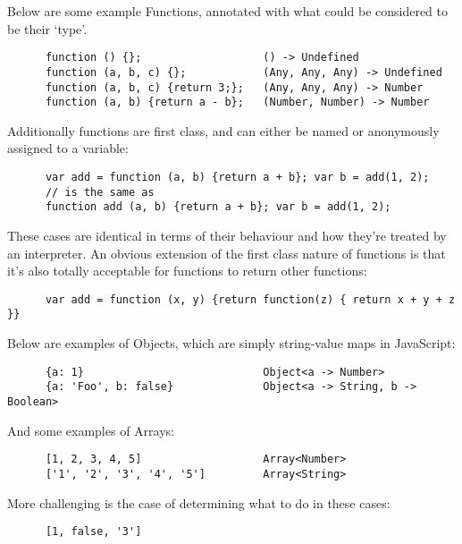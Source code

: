 \documentclass[british, twoside, openright]{bhamthesis}
\theoremstyle{definition}
\begin{document}
    Below are some example Functions, annotated with what could be considered to be their `type'.

    \begin{lstlisting}
      function () {};                   () -> Undefined
      function (a, b, c) {};            (Any, Any, Any) -> Undefined
      function (a, b, c) {return 3;};   (Any, Any, Any) -> Number
      function (a, b) {return a - b};   (Number, Number) -> Number
    \end{lstlisting}

    Additionally functions are first class, and can either be named or anonymously assigned to a variable:

    \begin{lstlisting}
      var add = function (a, b) {return a + b}; var b = add(1, 2);
      // is the same as
      function add (a, b) {return a + b}; var b = add(1, 2);
    \end{lstlisting}

    These cases are identical in terms of their behaviour and how they're treated by an interpreter. An obvious extension of the first class nature of functions is that it's also totally acceptable for functions to return other functions:

    \begin{lstlisting}
      var add = function (x, y) {return function(z) { return x + y + z }}
    \end{lstlisting}

    Below are examples of Objects, which are simply string-value maps in JavaScript:

    \begin{lstlisting}
      {a: 1}                            Object<a -> Number>
      {a: 'Foo', b: false}              Object<a -> String, b -> Boolean>
    \end{lstlisting}

    And some examples of Arrays:

    \begin{lstlisting}
      [1, 2, 3, 4, 5]                   Array<Number>
      ['1', '2', '3', '4', '5']         Array<String>
    \end{lstlisting}

    More challenging is the case of determining what to do in these cases:

    \begin{lstlisting}
      [1, false, '3']
    \end{lstlisting}
\end{document}
